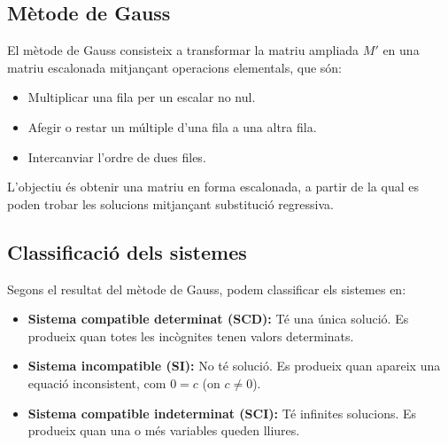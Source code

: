 \documentclass[12pt]{article}
\begin{document}
\subsection{Mètode de Gauss}
\begin{concept}
El mètode de Gauss consisteix a transformar la matriu ampliada \(M'\) en una matriu escalonada mitjançant operacions elementals, que són:
\begin{itemize}
    \item Multiplicar una fila per un escalar no nul.
    \item Afegir o restar un múltiple d'una fila a una altra fila.
    \item Intercanviar l'ordre de dues files.
\end{itemize}

L'objectiu és obtenir una matriu en forma escalonada, a partir de la qual es poden trobar les solucions mitjançant substitució regressiva.
\end{concept}

\subsection{Classificació dels sistemes}
\begin{concept}
Segons el resultat del mètode de Gauss, podem classificar els sistemes en:
\begin{itemize}
    \item \textbf{Sistema compatible determinat (SCD):} Té una única solució. Es produeix quan totes les incògnites tenen valors determinats.
    \item \textbf{Sistema incompatible (SI):} No té solució. Es produeix quan apareix una equació inconsistent, com \(0 = c\) (on \(c \neq 0\)).
    \item \textbf{Sistema compatible indeterminat (SCI):} Té infinites solucions. Es produeix quan una o més variables queden lliures.
\end{itemize}
\end{concept}
\end{document}
